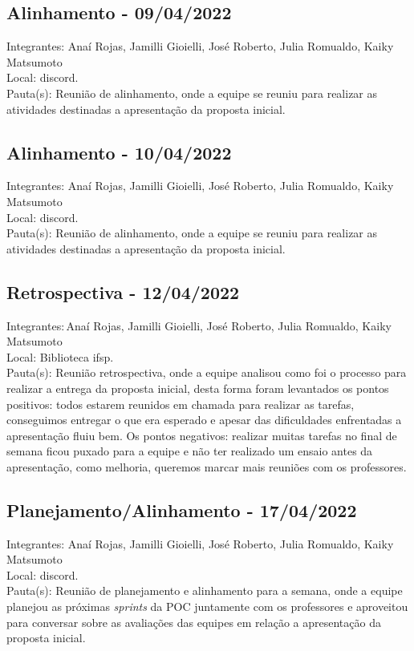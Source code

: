\subsection{Alinhamento - 09/04/2022}
\noindent Integrantes: Anaí Rojas, Jamilli Gioielli, José Roberto, Julia Romualdo, Kaiky Matsumoto \\
Local: \gls{discord}.\\
Pauta(s): Reunião de alinhamento, onde a equipe se reuniu para realizar as atividades destinadas a apresentação da proposta inicial.

\subsection{Alinhamento - 10/04/2022}
\noindent Integrantes: Anaí Rojas, Jamilli Gioielli, José Roberto, Julia Romualdo, Kaiky Matsumoto \\
Local: \gls{discord}.\\
Pauta(s): Reunião de alinhamento, onde a equipe se reuniu para realizar as atividades destinadas a apresentação da proposta inicial.

\subsection{Retrospectiva - 12/04/2022}
\noindent Integrantes:\,Anaí Rojas, Jamilli Gioielli, José Roberto, Julia Romualdo, Kaiky Matsumoto \\
Local: Biblioteca \acs{ifsp}.\\
Pauta(s): Reunião retrospectiva, onde a equipe analisou como foi o processo para realizar a entrega da proposta inicial, desta forma foram levantados os pontos positivos: todos estarem reunidos em chamada para realizar as tarefas, conseguimos entregar o que era esperado e apesar das dificuldades enfrentadas a apresentação fluiu bem. Os pontos negativos: realizar muitas tarefas no final de semana ficou puxado para a equipe e não ter realizado um ensaio antes da apresentação, como melhoria, queremos marcar mais reuniões com os professores.

\subsection{Planejamento/Alinhamento - 17/04/2022}
\noindent Integrantes: Anaí Rojas, Jamilli Gioielli, José Roberto, Julia Romualdo, Kaiky Matsumoto \\
Local: \gls{discord}.\\
Pauta(s): Reunião de planejamento e alinhamento para a semana, onde a equipe planejou as próximas \textsl{sprints} da \acs{POC} juntamente com os professores e aproveitou para conversar sobre as avaliações das equipes em relação a apresentação da proposta inicial. 

